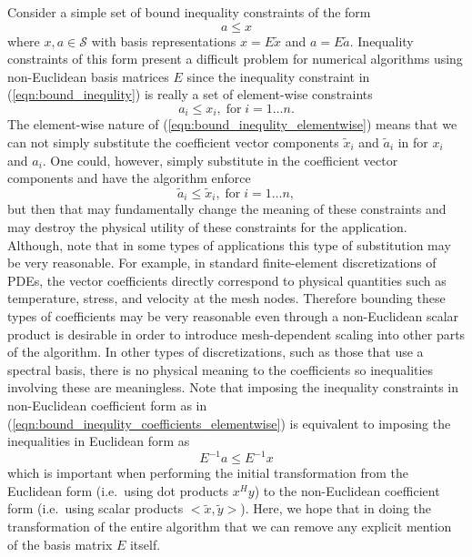\documentclass[pdf,ps2pdf,11pt]{SANDreport}
\begin{document}
Consider a simple set of bound inequality constraints of the form
%
\begin{equation}
a \le x
\label{eqn:bound_inequlity}
\end{equation}
%
where $x,a\in\mathcal{S}$ with basis representations $x = E\tilde{x}$ and $a =
E\tilde{a}$.  Inequality constraints of this form present a difficult problem
for numerical algorithms using non-Euclidean basis matrices $E$ since the
inequality constraint in (\ref{eqn:bound_inequlity}) is really a set of
element-wise constraints
%
\begin{equation}
a_i \le x_i , \; \mbox{for} \; i=1 \ldots n.
\label{eqn:bound_inequlity_elementwise}
\end{equation}
%
The element-wise nature of (\ref{eqn:bound_inequlity_elementwise}) means that
we can not simply substitute the coefficient vector components $\tilde{x}_i$
and $\tilde{a}_i$ in for $x_i$ and $a_i$.  One could, however, simply
substitute in the coefficient vector components and have the algorithm enforce
%
\begin{equation}
\tilde{a}_i \le \tilde{x}_i , \; \mbox{for} \; i=1 \ldots n,
\label{eqn:bound_inequlity_coefficients_elementwise}
\end{equation}
%
but then that may fundamentally change the meaning of these constraints and
may destroy the physical utility of these constraints for the application.
Although, note that in some types of applications this type of substitution
may be very reasonable.  For example, in standard finite-element
discretizations of PDEs, the vector coefficients directly correspond to
physical quantities such as temperature, stress, and velocity at the mesh
nodes.  Therefore bounding these types of coefficients may be very reasonable
even through a non-Euclidean scalar product is desirable in order to introduce
mesh-dependent scaling into other parts of the algorithm.  In other types of
discretizations, such as those that use a spectral basis, there is no physical
meaning to the coefficients so inequalities involving these are meaningless.
Note that imposing the inequality constraints in non-Euclidean coefficient
form as in (\ref{eqn:bound_inequlity_coefficients_elementwise}) is equivalent
to imposing the inequalities in Euclidean form as
%
\begin{equation}
E^{-1} a \le E^{-1} x
\label{eqn:bound_inequlity_with_basis_inverses}
\end{equation}
%
which is important when performing the initial transformation from the
Euclidean form (i.e.\ using dot products $x^H y$) to the non-Euclidean
coefficient form (i.e.\ using scalar products $<\tilde{x},\tilde{y}>$).  Here,
we hope that in doing the transformation of the entire algorithm that we can
remove any explicit mention of the basis matrix $E$ itself.
\end{document}
